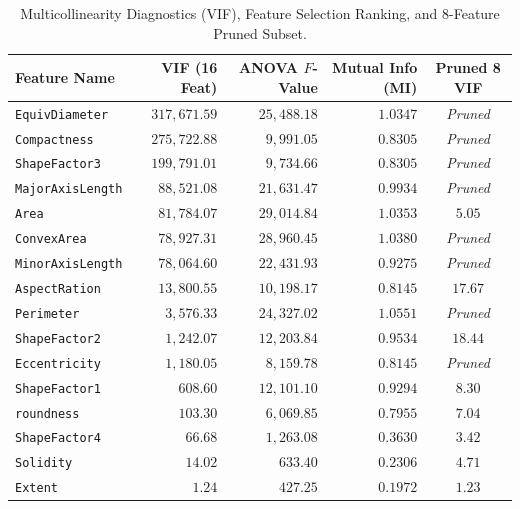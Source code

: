 \documentclass[11pt,a4paper]{article}
\begin{document}
\begin{table}[htbp]
    \centering
    \small
    \caption{Multicollinearity Diagnostics (VIF), Feature Selection Ranking, and 8-Feature Pruned Subset.}
    \label{tab:feature_selection}
    \setlength{\tabcolsep}{5pt}
    \begin{tabularx}{\linewidth}{@{} l r r r c @{}}
        \toprule
        \textbf{Feature Name} & \textbf{VIF (16 Feat)} & \textbf{ANOVA $F$-Value} & \textbf{Mutual Info (MI)} & \textbf{Pruned 8 VIF} \\
        \midrule
        \texttt{EquivDiameter} & $317{,}671.59$ & $25{,}488.18$ & $1.0347$ & \textit{Pruned} \\
        \texttt{Compactness} & $275{,}722.88$ & $9{,}991.05$ & $0.8305$ & \textit{Pruned} \\
        \texttt{ShapeFactor3} & $199{,}791.01$ & $9{,}734.66$ & $0.8305$ & \textit{Pruned} \\
        \texttt{MajorAxisLength} & $88{,}521.08$ & $21{,}631.47$ & $0.9934$ & \textit{Pruned} \\
        \texttt{Area} & $81{,}784.07$ & $29{,}014.84$ & $1.0353$ & $5.05$ \\
        \texttt{ConvexArea} & $78{,}927.31$ & $28{,}960.45$ & $1.0380$ & \textit{Pruned} \\
        \texttt{MinorAxisLength} & $78{,}064.60$ & $22{,}431.93$ & $0.9275$ & \textit{Pruned} \\
        \texttt{AspectRation} & $13{,}800.55$ & $10{,}198.17$ & $0.8145$ & $17.67$ \\
        \texttt{Perimeter} & $3{,}576.33$ & $24{,}327.02$ & $1.0551$ & \textit{Pruned} \\
        \texttt{ShapeFactor2} & $1{,}242.07$ & $12{,}203.84$ & $0.9534$ & $\mathbf{18.44}$ \\
        \texttt{Eccentricity} & $1{,}180.05$ & $8{,}159.78$ & $0.8145$ & \textit{Pruned} \\
        \texttt{ShapeFactor1} & $608.60$ & $12{,}101.10$ & $0.9294$ & $8.30$ \\
        \texttt{roundness} & $103.30$ & $6{,}069.85$ & $0.7955$ & $7.04$ \\
        \texttt{ShapeFactor4} & $66.68$ & $1{,}263.08$ & $0.3630$ & $3.42$ \\
        \texttt{Solidity} & $14.02$ & $633.40$ & $0.2306$ & $4.71$ \\
        \texttt{Extent} & $1.24$ & $427.25$ & $0.1972$ & $1.23$ \\
        \bottomrule
    \end{tabularx}
\end{table}
\end{document}
